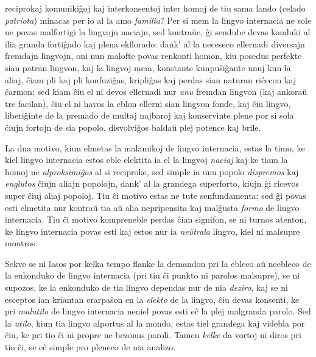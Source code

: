 reciprokaj komuniki\^goj kaj interkonsentoj inter homoj de tiu sama
lando (celado {\sl patriota}) minacas per io al la amo {\sl
familia}? Per si mem la lingvo internacia ne sole ne povas
malfortigi la lingvojn naciajn, sed kontra\u ue, \^gi sendube devas
konduki al ilia granda forti\^gado kaj plena ekflorado: dank' al la
neceseco ellernadi diversajn fremdajn lingvojn, oni nun malofte
povas renkonti homon, kiu posedus perfekte sian patran lingvon, kaj
la lingvoj mem, konstante kunpu\^si\^gante unuj kun la aliaj, \^ciam
pli kaj pli konfuzi\^gas, kripli\^gas kaj perdas sian naturan
ri\^cecon kaj \^carmon; sed kiam \^ciu el ni devos ellernadi nur
{\sl unu} fremdan lingvon (kaj ankora\u u tre facilan), \^ciu el ni
havos la eblon ellerni sian lingvon fonde, kaj \^ciu lingvo,
liberi\^ginte de la premado de multaj najbaroj kaj konservinte plene
por si sola \^ciujn fortojn de sia popolo, disvolvi\^gos balda\u u
plej potence kaj brile.

   La dua motivo, kiun elmetas la malamikoj de lingvo internacia, estas
la timo, ke kiel lingvo internacia estos eble elektita ia el la
lingvoj {\sl naciaj} kaj ke tiam la homoj ne {\sl alproksimi\^gos}
al si reciproke, sed simple ia unu popolo {\sl dispremos} kaj {\sl
englutos} \^ciujn aliajn popolojn, dank' al la grandega superforto,
kiujn \^gi ricevos super \^ciuj aliaj popoloj. Tiu \^ci motivo estas
ne tute senfundamenta; sed \^gi povas esti elmetita nur kontra\u u
tia a\u u alia nepripensita kaj mal\^gusta {\sl formo} de lingvo
internacia. Tiu \^ci motivo kompreneble perdas \^cian signifon, se
ni turnos atenton, ke lingvo internacia povas esti kaj estos nur ia
{\sl ne\u utrala} lingvo, kiel ni malsupre montros.

   Sekve se ni lasos por kelka tempo flanke la demandon pri la ebleco
a\u u neebleco de la enkonduko de lingvo internacia (pri tiu \^ci
punkto ni parolos malsupre), se ni supozos, ke la enkonduko de tia
lingvo dependas nur de nia {\sl deziro}, kaj se ni esceptos ian
kriantan erarpa\^son en la {\sl elekto} de la lingvo, \^ciu devas
konsenti, ke pri {\sl malutilo} de lingvo internacia neniel povas
esti e\^c la plej malgranda parolo. Sed la {\sl utilo}, kiun tia
lingvo alportus al la mondo, estas tiel grandega kaj videbla por
\^ciu, ke pri tio \^ci ni propre ne bezonus paroli. Tamen {\sl
kelke} da vortoj ni diros pri tio \^ci, se e\^c simple pro pleneco
de nia analizo.

